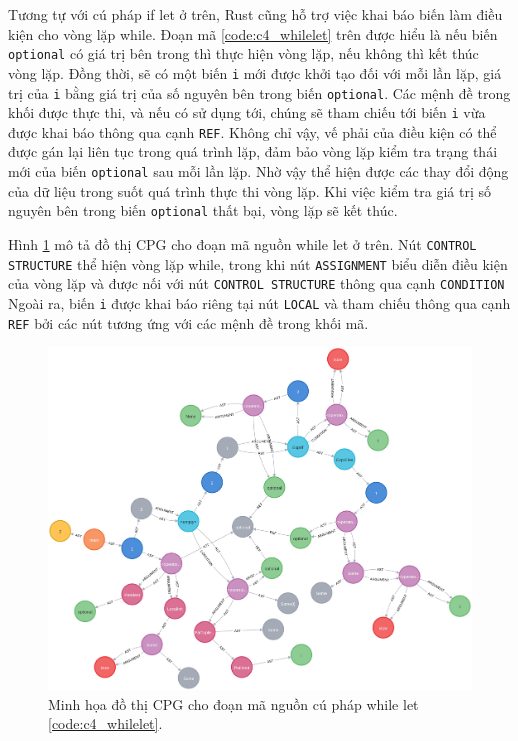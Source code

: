 Tương tự với cú pháp if let ở trên, Rust cũng hỗ trợ việc khai báo biến làm điều kiện cho vòng lặp while.
Đoạn mã \ref{code:c4_whilelet} trên được hiểu là nếu biến \texttt{optional} có giá trị bên trong thì thực hiện vòng lặp, nếu không thì kết thúc vòng lặp.
Đồng thời, sẽ có một biến \texttt{i} mới được khởi tạo đối với mỗi lần lặp, giá trị của \texttt{i} bằng giá trị của số nguyên bên trong biến \texttt{optional}.
Các mệnh đề trong khối được thực thi, và nếu có sử dụng tới, chúng sẽ tham chiếu tới biến \texttt{i} vừa được khai báo thông qua cạnh \texttt{REF}.
Không chỉ vậy, vế phải của điều kiện có thể được gán lại liên tục trong quá trình lặp, đảm bảo vòng lặp kiểm tra trạng thái mới của biến \texttt{optional} sau mỗi lần lặp.
Nhờ vậy thể hiện được các thay đổi động của dữ liệu trong suốt quá trình thực thi vòng lặp.
Khi việc kiểm tra giá trị số nguyên bên trong biến \texttt{optional} thất bại, vòng lặp sẽ kết thúc.

Hình \ref{img:c4_cpg_whilelet} mô tả đồ thị CPG cho đoạn mã nguồn while let ở trên.
Nút \texttt{CONTROL STRUCTURE} thể hiện vòng lặp while, trong khi nút \texttt{ASSIGNMENT} biểu diễn điều kiện của vòng lặp và được nối với nút \texttt{CONTROL STRUCTURE} thông qua cạnh \texttt{CONDITION}
Ngoài ra, biến \texttt{i} được khai báo riêng tại nút \texttt{LOCAL} và tham chiếu thông qua cạnh \texttt{REF} bởi các nút tương ứng với các mệnh đề trong khối mã.

\begin{figure}[H]
    \includegraphics[width=1\columnwidth]{figures/c4/c4_whilelet.png}
    \centering
    \caption{Minh họa đồ thị CPG cho đoạn mã nguồn cú pháp while let \ref{code:c4_whilelet}.}
    \label{img:c4_cpg_whilelet}
\end{figure}

